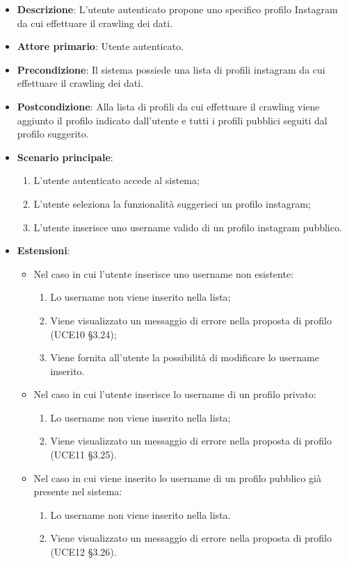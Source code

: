 \begin{itemize}
	\item \textbf{Descrizione}: L'utente autenticato propone uno specifico profilo Instagram da cui effettuare il crawling dei dati.
    \item \textbf{Attore primario}: Utente autenticato.
    \item \textbf{Precondizione}: Il sistema possiede una lista di profili instagram da cui effettuare il crawling dei dati.
    \item \textbf{Postcondizione}: Alla lista di profili da cui effettuare il crawling viene aggiunto il profilo indicato dall’utente e tutti i profili pubblici seguiti dal profilo suggerito.
    \item \textbf{Scenario principale}: 
    \begin{enumerate}
        \item L'utente autenticato accede al sistema;
        \item L’utente seleziona la funzionalità suggerisci un profilo instagram;
        \item L’utente inserisce uno username valido di un profilo instagram pubblico.
    \end{enumerate}
    \item \textbf{Estensioni}:
    \begin{itemize}
        \item Nel caso in cui l’utente inserisce uno username non esistente:
        \begin{enumerate}
            \item Lo username non viene inserito nella lista;
            \item Viene visualizzato un messaggio di errore nella proposta di profilo (UCE10 §3.24);
            \item Viene fornita all’utente la possibilità di modificare lo username inserito.
        \end{enumerate}
        \item Nel caso in cui l’utente inserisce lo username di un profilo privato:
        \begin{enumerate}
            \item Lo username non viene inserito nella lista;
            \item Viene visualizzato un messaggio di errore nella proposta di profilo (UCE11 §3.25).
        \end{enumerate}
        \item Nel caso in cui viene inserito lo username di un profilo pubblico già presente nel sistema:
        \begin{enumerate}
            \item Lo username non viene inserito nella lista.
            \item Viene visualizzato un messaggio di errore nella proposta di profilo (UCE12 §3.26).
        \end{enumerate} 
    \end{itemize}
\end{itemize}

